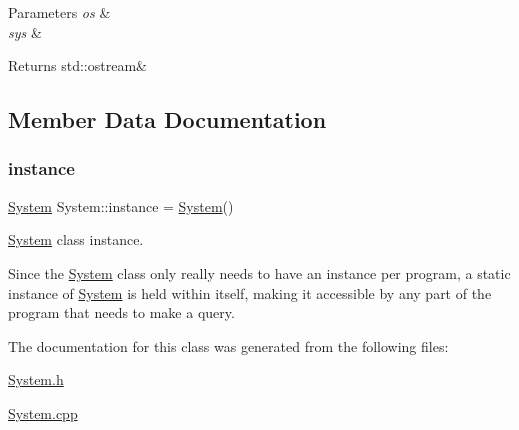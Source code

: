\begin{DoxyParams}{Parameters}
{\em os} & \\
\hline
{\em sys} & \\
\hline
\end{DoxyParams}
\begin{DoxyReturn}{Returns}
std\+::ostream\& 
\end{DoxyReturn}


\subsection{Member Data Documentation}
\mbox{\label{classSystem_a40d348884d1b737ecd26b4bc6509bf48}} 
\subsubsection{\texorpdfstring{instance}{instance}}
{\footnotesize\ttfamily \mbox{\hyperlink{classSystem}{System}} System\+::instance = \mbox{\hyperlink{classSystem}{System}}()\hspace{0.3cm}{\ttfamily [static]}}



\mbox{\hyperlink{classSystem}{System}} class instance. 

Since the \mbox{\hyperlink{classSystem}{System}} class only really needs to have an instance per program, a static instance of \mbox{\hyperlink{classSystem}{System}} is held within itself, making it accessible by any part of the program that needs to make a query. 

The documentation for this class was generated from the following files\+:\begin{DoxyCompactItemize}
\item 
\mbox{\hyperlink{System_8h}{System.\+h}}\item 
\mbox{\hyperlink{System_8cpp}{System.\+cpp}}\end{DoxyCompactItemize}
